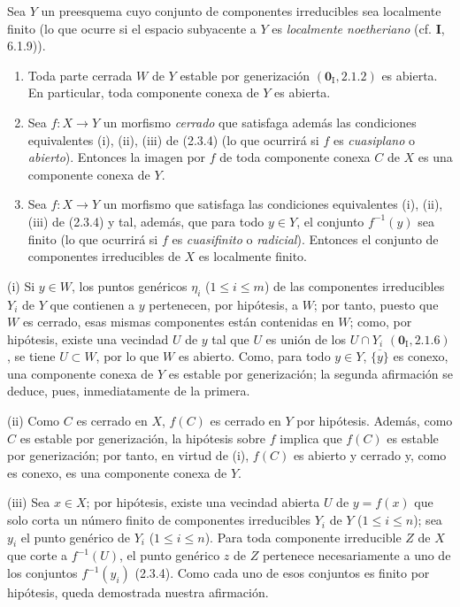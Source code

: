 \begin{proposition}[2.3.6]
\label{IV.2.3.6-fr}
Sea $Y$ un preesquema cuyo conjunto de componentes irreducibles sea
localmente finito \textup{(lo que ocurre si el espacio subyacente a $Y$ es
\emph{localmente noetheriano} (cf. \textbf{I}, 6.1.9))}.
\begin{enumerate}
  \item[\textup{(i)}] Toda parte cerrada $W$ de $Y$ estable por generización
  $(\mathbf{0}_{\mathrm I},2.1.2)$ es abierta. En particular, toda componente conexa
  de $Y$ es abierta.
  \item[\textup{(ii)}] Sea $f:X\to Y$ un morfismo \emph{cerrado} que satisfaga además las
  condiciones equivalentes \textup{(i), (ii), (iii)} de \textup{(2.3.4) (lo que ocurrirá si
  $f$ es \emph{cuasiplano} o \emph{abierto})}. Entonces la imagen por $f$ de toda componente
  conexa $C$ de $X$ es una componente conexa de $Y$.
  \item[\textup{(iii)}] Sea $f:X\to Y$ un morfismo que satisfaga las condiciones
  equivalentes \textup{(i), (ii), (iii)} de \textup{(2.3.4)} y tal, además, que para todo
  $y\in Y$, el conjunto $f^{-1}(y)$ sea finito \textup{(lo que ocurrirá si $f$ es
  \emph{cuasifinito} o \emph{radicial})}. Entonces el conjunto de componentes irreducibles de
  $X$ es localmente finito.
\end{enumerate}
\end{proposition}

(i) Si $y\in W$, los puntos genéricos $\eta_i$ ($1\leq i\leq m$) de las
componentes irreducibles $Y_i$ de $Y$ que contienen a $y$ pertenecen, por
hipótesis, a $W$; por tanto, puesto que $W$ es cerrado, esas mismas componentes
están contenidas en $W$; como, por hipótesis, existe una vecindad $U$ de $y$ tal
que $U$ es unión de los $U\cap Y_i$ $(\mathbf{0}_{\mathrm I},2.1.6)$, se tiene
$U\subset W$, por lo que $W$
es abierto. Como, para todo $y\in Y$,
$\overline{\{y\}}$ es conexo, una componente conexa de $Y$ es estable por
generización; la segunda afirmación se deduce, pues, inmediatamente de la
primera.

(ii) Como $C$ es cerrado en $X$, $f(C)$ es cerrado en $Y$ por hipótesis.
Además, como $C$ es estable por generización, la hipótesis sobre $f$ implica
que $f(C)$ es estable por generización; por tanto, en virtud de (i), $f(C)$ es
abierto y cerrado y, como es conexo, es una componente conexa de $Y$.

(iii) Sea $x\in X$; por hipótesis, existe una vecindad abierta $U$ de
$y=f(x)$ que solo corta un número finito de componentes irreducibles $Y_i$ de
$Y$ ($1\leq i\leq n$); sea $y_i$ el punto genérico de $Y_i$
($1\leq i\leq n$). Para toda componente irreducible $Z$ de $X$ que corte a
$f^{-1}(U)$, el punto genérico $z$ de $Z$ pertenece necesariamente a uno de
los conjuntos $f^{-1}(y_i)$ (2.3.4). Como cada uno de esos conjuntos es finito
por hipótesis, queda demostrada nuestra afirmación.

